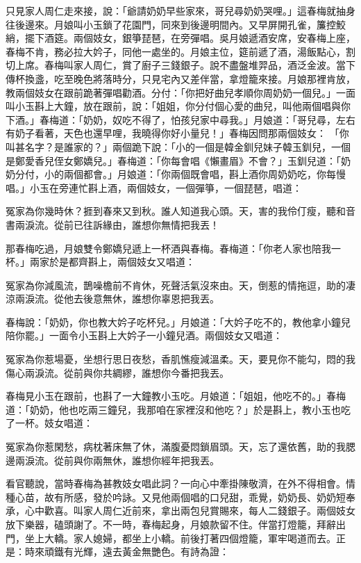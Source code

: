 只見家人周仁走來接，說：「爺請奶奶早些家來，哥兒尋奶奶哭哩。」這春梅就抽身往後邊來。月娘叫小玉鎖了花園門，同來到後邊明間內。又早屏開孔雀，簾控鮫綃，擺下酒筵。兩個妓女，銀箏琵琶，在旁彈唱。吳月娘遞酒安席，安春梅上座，春梅不肯，務必拉大妗子，同他一處坐的。月娘主位，筵前遞了酒，湯飯點心，割切上席。春梅叫家人周仁，賞了廚子三錢銀子。說不盡盤堆羿品，酒泛金波。當下傳杯換盞，吃至晚色將落時分，只見宅內又差伴當，拿燈籠來接。月娘那裡肯放，教兩個妓女在跟前跪著彈唱勸酒。分付：「你把好曲兒孝順你周奶奶一個兒。」一面叫小玉斟上大鐘，放在跟前，說：「姐姐，你分付個心愛的曲兒，叫他兩個唱與你下酒。」春梅道：「奶奶，奴吃不得了，怕孩兒家中尋我。」月娘道：「哥兒尋，左右有奶子看著，天色也還早哩，我曉得你好小量兒！」春梅因問那兩個妓女： 「你叫甚名字？是誰家的？」兩個跪下說：「小的一個是韓金釧兒妹子韓玉釧兒，一個是鄭愛香兒侄女鄭嬌兒。」春梅道：「你每會唱《懶畫眉》不會？」玉釧兒道：「奶奶分付，小的兩個都會。」月娘道：「你兩個既會唱，斟上酒你周奶奶吃，你每慢唱。」小玉在旁連忙斟上酒，兩個妓女，一個彈箏，一個琵琶，唱道：

冤家為你幾時休？捱到春來又到秋。誰人知道我心頭。天，害的我伶仃瘦，聽和音書兩淚流。從前已往訴緣由，誰想你無情把我丟！

那春梅吃過，月娘雙令鄭嬌兒遞上一杯酒與春梅。春梅道：「你老人家也陪我一杯。」兩家於是都齊斟上，兩個妓女又唱道：

冤家為你減風流，鵲噪檐前不肯休，死聲活氣沒來由。天，倒惹的情拖逗，助的凄涼兩淚流。從他去後意無休，誰想你辜恩把我丟。

春梅說：「奶奶，你也教大妗子吃杯兒。」月娘道：「大妗子吃不的，教他拿小鐘兒陪你罷。」一面令小玉斟上大妗子一小鐘兒酒。兩個妓女又唱道：

冤家為你惹場憂，坐想行思日夜愁，香肌憔瘦減溫柔。天，要見你不能勾，悶的我傷心兩淚流。從前與你共綢繆，誰想你今番把我丟。

春梅見小玉在跟前，也斟了一大鐘教小玉吃。月娘道：「姐姐，他吃不的。」春梅道：「奶奶，他也吃兩三鐘兒，我那咱在家裡沒和他吃？」於是斟上，教小玉也吃了一杯。妓女唱道：

冤家為你惹閑愁，病枕著床無了休，滿腹憂悶鎖眉頭。天，忘了還依舊，助的我腮邊兩淚流。從前與你兩無休，誰想你經年把我丟。

看官聽說，當時春梅為甚教妓女唱此詞？一向心中牽掛陳敬濟，在外不得相會。情種心苗，故有所感，發於吟詠。又見他兩個唱的口兒甜，乖覺，奶奶長、奶奶短奉承，心中歡喜。叫家人周仁近前來，拿出兩包兒賞賜來，每人二錢銀子。兩個妓女放下樂器，磕頭謝了。不一時，春梅起身，月娘款留不住。伴當打燈籠，拜辭出門，坐上大轎。家人媳婦，都坐上小轎。前後打著四個燈籠，軍牢喝道而去。正是：時來頑鐵有光輝，遠去黃金無艷色。有詩為證：

